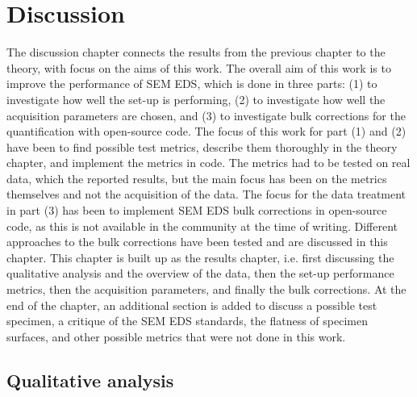 %
\chapter{Discussion}
\label{ch:discussion}

The discussion chapter connects the results from the previous chapter to the theory, with focus on the aims of this work.
The overall aim of this work is to improve the performance of SEM EDS, which is done in three parts:
(1) to investigate how well the set-up is performing, (2) to investigate how well the acquisition parameters are chosen, and (3) to investigate bulk corrections for the quantification with open-source code.
The focus of this work for part (1) and (2) have been to find possible test metrics, describe them thoroughly in the theory chapter, and implement the metrics in code.
The metrics had to be tested on real data, which the reported results, but the main focus has been on the metrics themselves and not the acquisition of the data.
The focus for the data treatment in part (3) has been to implement SEM EDS bulk corrections in open-source code, as this is not available in the community at the time of writing.
Different approaches to the bulk corrections have been tested and are discussed in this chapter.
This chapter is built up as the results chapter, i.e. first discussing the qualitative analysis and the overview of the data, then the set-up performance metrics, then the acquisition parameters, and finally the bulk corrections.
At the end of the chapter, an additional section is added to discuss a possible test specimen, a critique of the SEM EDS standards, the flatness of specimen surfaces, and other possible metrics that were not done in this work.











\section{Qualitative analysis}
\label{discussion:qualitative_analysis}


